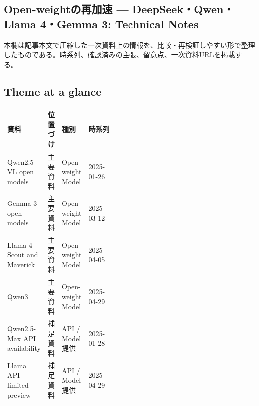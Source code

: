 \subsection*{Open-weightの再加速 — DeepSeek・Qwen・Llama 4・Gemma 3: Technical Notes}
本欄は記事本文で圧縮した一次資料上の情報を、比較・再検証しやすい形で整理したものである。時系列、確認済みの主張、留意点、一次資料URLを掲載する。
\medskip
\subsection*{Theme at a glance}
\begin{center}
\footnotesize
\begin{tabularx}{\linewidth}{@{}p{0.20\linewidth}p{0.10\linewidth}p{0.14\linewidth}X@{}}
\toprule
資料 & 位置づけ & 種別 & 時系列 \\
\midrule
Qwen2.5-VL open models & 主要資料 & Open-weight Model & 2025-01-26   \\
Gemma 3 open models & 主要資料 & Open-weight Model & 2025-03-12   \\
Llama 4 Scout and Maverick & 主要資料 & Open-weight Model & 2025-04-05   \\
Qwen3 & 主要資料 & Open-weight Model & 2025-04-29   \\
Qwen2.5-Max API availability & 補足資料 & API / Model提供 & 2025-01-28   \\
Llama API limited preview & 補足資料 & API / Model提供 & 2025-04-29   \\
\bottomrule
\end{tabularx}
\end{center}
\normalsize


